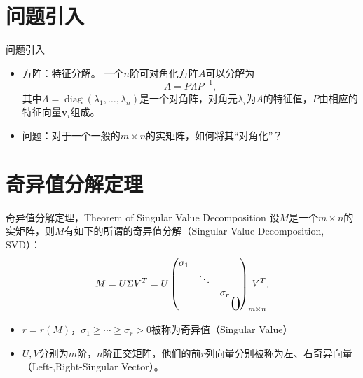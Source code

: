 \section{问题引入} %
\begin{frame}

\begin{block}{问题引入}
\begin{itemize}
\item<1-> 方阵：特征分解。\newline
一个$n$阶可对角化方阵$A$可以分解为
$$A = P\Lambda P^{-1},$$
其中$\Lambda = \operatorname{diag}(\lambda_1,\ldots,\lambda_n)$是一个{\color{red}对角阵}，对角元$\lambda_i$为$A$的特征值，$P$由相应的特征向量$\mathbf{v}_i$组成。\newline

\item<2-> 问题：对于一个一般的$m\times n$的实矩阵，如何将其``对角化''？
\end{itemize}
\end{block}

\end{frame}


\section{奇异值分解定理} 


\begin{frame}

\begin{block}{奇异值分解定理，Theorem of Singular Value Decomposition}
设$M$是一个$m\times n$的实矩阵，则$M$有如下的所谓的奇异值分解（Singular Value Decomposition, SVD）：
$$M = U\Sigma V^T = U\begin{pmatrix}
\sigma_1 & & & \\ & \ddots & & \\ & & \sigma_r & \\ & & & \bigzero \end{pmatrix}_{m\times n}\!\!\!\!\!\!\!\!\!\! V^T,$$
\pause
\begin{itemize}
\item $r = r(M)$，$\sigma_1 \geqslant \cdots \geqslant \sigma_r > 0$被称为奇异值（Singular Value）
\item $U,V$分别为$m$阶，$n$阶正交矩阵，他们的前$r$列向量分别被称为左、右奇异向量（Left-,Right-Singular Vector）。
\end{itemize}
\end{block}

\end{frame}

